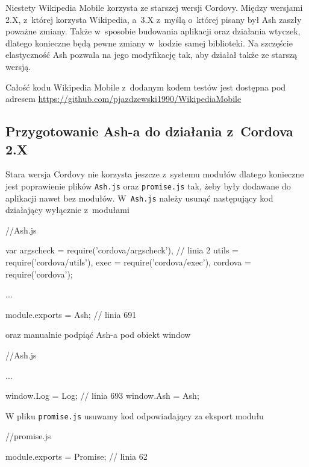 \documentclass[brudnopis]{xmgr}
\begin{document}
Niestety Wikipedia Mobile korzysta ze starszej wersji Cordovy. Między wersjami 2.X, z~której korzysta Wikipedia, a~3.X z~myślą o~której pisany był Ash zaszły poważne zmiany. Także w~sposobie budowania aplikacji oraz działania wtyczek, dlatego konieczne będą pewne zmiany w~kodzie samej biblioteki. Na szczęście elastyczność Ash pozwala na jego modyfikację tak, aby działał także ze starszą wersją.

Całość kodu Wikipedia Mobile z~dodanym kodem testów jest dostępna pod adresem \url{https://github.com/pjazdzewski1990/WikipediaMobile} 

\subsection{Przygotowanie Ash-a do działania z~Cordova 2.X}
  
Stara wersja Cordovy nie korzysta jeszcze z~systemu modułów dlatego konieczne jest poprawienie plików \texttt{Ash.js} oraz \texttt{promise.js} tak, żeby były dodawane do aplikacji nawet bez modułów.  W~\texttt{Ash.js} należy usunąć następujący kod działający wyłącznie z~modułami

\begin{javascriptcode}
   //Ash.js
  
  var argscheck = require('cordova/argscheck'), // linia 2
    utils = require('cordova/utils'),
    exec = require('cordova/exec'),
    cordova = require('cordova');

  ...

  module.exports = Ash;   // linia 691

\end{javascriptcode}

oraz manualnie podpiąć Ash-a pod obiekt window

\begin{javascriptcode}
   //Ash.js

  ...

  window.Log = Log;   // linia 693
  window.Ash = Ash;

\end{javascriptcode}

W pliku \texttt{promise.js} usuwamy kod odpowiadający za eksport modułu

\begin{javascriptcode}
   //promise.js
 
  module.exports = Promise;   // linia 62 

\end{javascriptcode}
\end{document}
